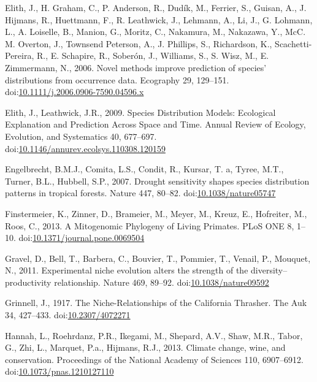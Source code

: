 \hypertarget{ref-Elith2006}{}
Elith, J., H. Graham, C., P. Anderson, R., Dudík, M., Ferrier, S.,
Guisan, A., J. Hijmans, R., Huettmann, F., R. Leathwick, J., Lehmann,
A., Li, J., G. Lohmann, L., A. Loiselle, B., Manion, G., Moritz, C.,
Nakamura, M., Nakazawa, Y., McC. M. Overton, J., Townsend Peterson, A.,
J. Phillips, S., Richardson, K., Scachetti-Pereira, R., E. Schapire, R.,
Soberón, J., Williams, S., S. Wisz, M., E. Zimmermann, N., 2006. Novel
methods improve prediction of species' distributions from occurrence
data. Ecography 29, 129--151.
doi:\href{https://doi.org/10.1111/j.2006.0906-7590.04596.x}{10.1111/j.2006.0906-7590.04596.x}

\hypertarget{ref-Elith2009a}{}
Elith, J., Leathwick, J.R., 2009. Species Distribution Models:
Ecological Explanation and Prediction Across Space and Time. Annual
Review of Ecology, Evolution, and Systematics 40, 677--697.
doi:\href{https://doi.org/10.1146/annurev.ecolsys.110308.120159}{10.1146/annurev.ecolsys.110308.120159}

\hypertarget{ref-Engelbrecht2007}{}
Engelbrecht, B.M.J., Comita, L.S., Condit, R., Kursar, T. a, Tyree,
M.T., Turner, B.L., Hubbell, S.P., 2007. Drought sensitivity shapes
species distribution patterns in tropical forests. Nature 447, 80--82.
doi:\href{https://doi.org/10.1038/nature05747}{10.1038/nature05747}

\hypertarget{ref-Finstermeier2013}{}
Finstermeier, K., Zinner, D., Brameier, M., Meyer, M., Kreuz, E.,
Hofreiter, M., Roos, C., 2013. A Mitogenomic Phylogeny of Living
Primates. PLoS ONE 8, 1--10.
doi:\href{https://doi.org/10.1371/journal.pone.0069504}{10.1371/journal.pone.0069504}

\hypertarget{ref-Gravel2011c}{}
Gravel, D., Bell, T., Barbera, C., Bouvier, T., Pommier, T., Venail, P.,
Mouquet, N., 2011. Experimental niche evolution alters the strength of
the diversity--productivity relationship. Nature 469, 89--92.
doi:\href{https://doi.org/10.1038/nature09592}{10.1038/nature09592}

\hypertarget{ref-Grinnell1917a}{}
Grinnell, J., 1917. The Niche-Relationships of the California Thrasher.
The Auk 34, 427--433.
doi:\href{https://doi.org/10.2307/4072271}{10.2307/4072271}

\hypertarget{ref-Hannah2013}{}
Hannah, L., Roehrdanz, P.R., Ikegami, M., Shepard, A.V., Shaw, M.R.,
Tabor, G., Zhi, L., Marquet, P.a., Hijmans, R.J., 2013. Climate change,
wine, and conservation. Proceedings of the National Academy of Sciences
110, 6907--6912.
doi:\href{https://doi.org/10.1073/pnas.1210127110}{10.1073/pnas.1210127110}

